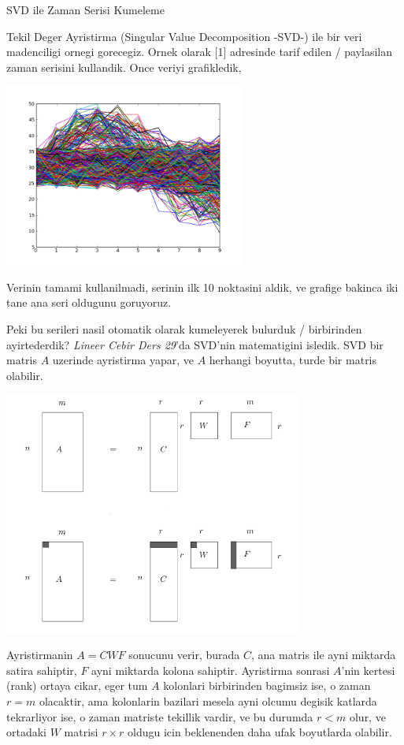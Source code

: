 \documentclass[12pt,fleqn]{article}\usepackage{../common}
\begin{document}
SVD ile Zaman Serisi Kumeleme

Tekil Deger Ayristirma (Singular Value Decomposition -SVD-) ile bir veri
madenciligi ornegi gorecegiz. Ornek olarak [1] adresinde tarif edilen /
paylasilan zaman serisini kullandik. Once veriyi grafikledik,

\includegraphics[height=6cm]{data.png}

Verinin tamami kullanilmadi, serinin ilk 10 noktasini aldik, ve grafige
bakinca iki tane ana seri oldugunu goruyoruz. 



Peki bu serileri nasil otomatik olarak kumeleyerek bulurduk / birbirinden
ayirtederdik?  {\em Lineer Cebir Ders 29}'da SVD'nin matematigini
isledik. SVD bir matris $A$ uzerinde ayristirma yapar, ve $A$ herhangi
boyutta, turde bir matris olabilir.

\includegraphics[height=8cm]{svd1.png}

Ayristirmanin $A=CWF$ sonucunu verir, burada $C$, ana matris ile ayni
miktarda satira sahiptir, $F$ ayni miktarda kolona sahiptir. Ayristirma
sonrasi $A$'nin kertesi (rank) ortaya cikar, eger tum $A$ kolonlari
birbirinden bagimsiz ise, o zaman $r=m$ olacaktir, ama kolonlarin bazilari
mesela ayni olcumu degisik katlarda tekrarliyor ise, o zaman matriste
tekillik vardir, ve bu durumda $r < m$ olur, ve ortadaki $W$ matrisi $r
\times r$ 
oldugu icin beklenenden daha ufak boyutlarda olabilir. 
\end{document}
